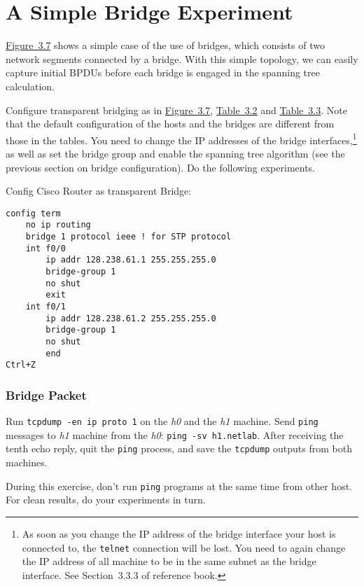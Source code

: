 \documentclass{../UTNetLab}
\begin{document}
\part{A Simple Bridge Experiment}
    \hyperref[fig:3.7]{Figure~3.7} shows a simple case of the use of bridges, which consists of two network segments connected by a bridge.
    With this simple topology, we can easily capture initial BPDUs before each bridge is engaged in the spanning tree calculation.

    Configure transparent bridging as in \hyperref[fig:3.7]{Figure~3.7}, \hyperref[tab:3.2]{Table~3.2} and \hyperref[tab:3.3]{Table~3.3}.
    Note that the default configuration of the hosts and the bridges are different from those in the tables.
    You need to change the IP addresses of the bridge interfaces,\footnote{As soon as you change the IP address of the bridge interface your host is connected to, the \lstinline{telnet} connection will be lost.
    You need to again change the IP address of all machine to be in the same subnet as the bridge interface.
    See Section~3.3.3  of reference book.} as well as set the bridge group and enable the spanning tree algorithm (see the previous section on bridge configuration).
    Do the following experiments.

    Config Cisco Router as transparent Bridge:
    \begin{lstlisting}[language={cisco}]
config term
    no ip routing
    bridge 1 protocol ieee ! for STP protocol
    int f0/0
        ip addr 128.238.61.1 255.255.255.0
        bridge-group 1
        no shut
        exit
    int f0/1
        ip addr 128.238.61.2 255.255.255.0
        bridge-group 1
        no shut
        end
Ctrl+Z
    \end{lstlisting}

\section{Bridge Packet}
    Run \lstinline{tcpdump -en ip proto 1} on the \textit{h0} and the \textit{h1} machine.
    Send \lstinline{ping} messages to \textit{h1} machine from the \textit{h0}: \lstinline[emph={h1,netlab}]{ping -sv h1.netlab}.
    After receiving the tenth echo reply, quit the \lstinline{ping} process, and save the \lstinline{tcpdump} outputs from both machines.

    During this exercise, don’t run \lstinline{ping} programs at the same time from other host.
    For clean results, do your experiments in turn.
    
\end{document}
